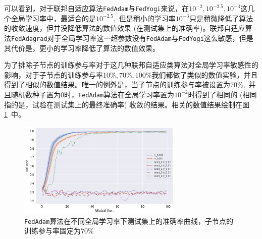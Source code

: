 可以看到，对于联邦自适应算法\texttt{FedAdam}与\texttt{FedYogi}来说，在$10^{-2}, 10^{-2.5}, 10^{-3}$这几个全局学习率中，最适合的是$10^{-2.5},$ 但是稍小的学习率$10^{-3}$只是稍微降低了算法的收敛速度，但并没降低算法的数值效果 (在测试集上的准确率)。联邦自适应算法\texttt{FedAdagrad}对于全局学习率这一超参数没有\texttt{FedAdam}与\texttt{FedYogi}这么敏感，但是其代价是，更小的学习率降低了算法的数值效果。

为了排除子节点的训练参与率对于这几种联邦自适应类算法对全局学习率敏感性的影响，对于子节点的训练参与率$10\%, 70\%, 100\%$我们都做了类似的数值实验，并且得到了相似的数值结果。唯一的例外是，当子节点的训练参与率被设置为$70\%,$ 并且随机数种子置为$0$时，\texttt{FedAdam}算法在全局学习率置为$10^{-2}$时得到了相同的 (相同指的是，试验在测试集上的最终准确率) 收敛的结果。相关的数值结果绘制在图\ref{fig:adam-sample-70-compare-lr-val-acc}~中。

\begin{figure}[ht]
    \centering
    \includegraphics[width=0.7\textwidth]{figures/adam-sample-70-compare-lr-val-acc.pdf}
    \caption{\texttt{FedAdam}算法在不同全局学习率下测试集上的准确率曲线，子节点的训练参与率固定为$70\%$}
    \label{fig:adam-sample-70-compare-lr-val-acc}
\end{figure}
